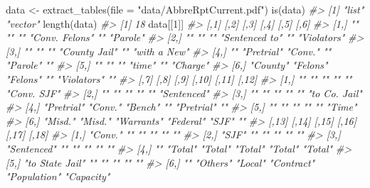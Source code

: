 \documentclass[
  12pt,
]{book}
\newenvironment{Shaded}{\begin{snugshade}}{\end{snugshade}}
\newcommand{\AttributeTok}[1]{\textcolor[rgb]{0.61,0.61,0.61}{#1}}
\newcommand{\CommentTok}[1]{\textcolor[rgb]{0.37,0.37,0.37}{\textit{#1}}}
\newcommand{\DecValTok}[1]{\textcolor[rgb]{0.06,0.06,0.06}{#1}}
\newcommand{\FunctionTok}[1]{\textcolor[rgb]{0,0,0}{#1}}
\newcommand{\NormalTok}[1]{#1}
\newcommand{\OtherTok}[1]{\textcolor[rgb]{0.37,0.37,0.37}{#1}}
\newcommand{\StringTok}[1]{\textcolor[rgb]{0.5,0.5,0.5}{#1}}
\begin{document}
\begin{Shaded}
\begin{Highlighting}[]
\NormalTok{data }\OtherTok{\textless{}{-}} \FunctionTok{extract\_tables}\NormalTok{(}\AttributeTok{file =} \StringTok{"data/AbbreRptCurrent.pdf"}\NormalTok{)}
\FunctionTok{is}\NormalTok{(data)}
\CommentTok{\#\textgreater{} [1] "list"   "vector"}
\FunctionTok{length}\NormalTok{(data)}
\CommentTok{\#\textgreater{} [1] 18}
\NormalTok{data[[}\DecValTok{1}\NormalTok{]]}
\CommentTok{\#\textgreater{}      [,1]     [,2]       [,3]     [,4]           [,5]        [,6]        }
\CommentTok{\#\textgreater{} [1,] ""       ""         ""       "Conv. Felons" ""          "Parole"    }
\CommentTok{\#\textgreater{} [2,] ""       ""         ""       "Sentenced to" ""          "Violators" }
\CommentTok{\#\textgreater{} [3,] ""       ""         ""       "County Jail"  ""          "with a New"}
\CommentTok{\#\textgreater{} [4,] ""       "Pretrial" "Conv."  ""             "Parole"    ""          }
\CommentTok{\#\textgreater{} [5,] ""       ""         ""       "time"         ""          "Charge"    }
\CommentTok{\#\textgreater{} [6,] "County" "Felons"   "Felons" ""             "Violators" ""          }
\CommentTok{\#\textgreater{}      [,7]       [,8]    [,9]       [,10]     [,11]      [,12]        }
\CommentTok{\#\textgreater{} [1,] ""         ""      ""         ""        ""         "Conv. SJF"  }
\CommentTok{\#\textgreater{} [2,] ""         ""      ""         ""        ""         "Sentenced"  }
\CommentTok{\#\textgreater{} [3,] ""         ""      ""         ""        ""         "to Co. Jail"}
\CommentTok{\#\textgreater{} [4,] "Pretrial" "Conv." "Bench"    ""        "Pretrial" ""           }
\CommentTok{\#\textgreater{} [5,] ""         ""      ""         ""        ""         "Time"       }
\CommentTok{\#\textgreater{} [6,] "Misd."    "Misd." "Warrants" "Federal" "SJF"      ""           }
\CommentTok{\#\textgreater{}      [,13]           [,14]    [,15]   [,16]      [,17]        [,18]     }
\CommentTok{\#\textgreater{} [1,] "Conv."         ""       ""      ""         ""           ""        }
\CommentTok{\#\textgreater{} [2,] "SJF"           ""       ""      ""         ""           ""        }
\CommentTok{\#\textgreater{} [3,] "Sentenced"     ""       ""      ""         ""           ""        }
\CommentTok{\#\textgreater{} [4,] ""              "Total"  "Total" "Total"    "Total"      "Total"   }
\CommentTok{\#\textgreater{} [5,] "to State Jail" ""       ""      ""         ""           ""        }
\CommentTok{\#\textgreater{} [6,] ""              "Others" "Local" "Contract" "Population" "Capacity"}

\end{Highlighting}
\end{Shaded}
\end{document}
